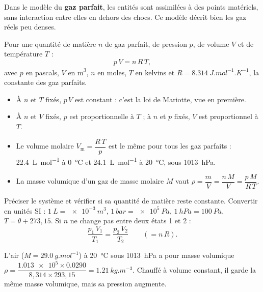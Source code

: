\begin{definition}
Dans le modèle du \textbf{gaz parfait}, les entités sont assimilées à des points matériels, sans interaction entre
elles en dehors des chocs. Ce modèle décrit bien les gaz réels peu denses.
\end{definition}
\begin{loi}
Pour une quantité de matière $n$ de gaz parfait, de pression $p$, de volume $V$ et de température $T$ :
\[p\,V=n\,R\,T,\]
avec $p$ en pascals, $V$ en \unit{m^3}, $n$ en moles, $T$ en kelvins et $R=\qty{8,314}{J.mol^{-1}.K^{-1}}$, la constante des gaz
parfaits.
\end{loi}
\begin{propriete}[Conséquences]
\begin{itemize}
\item À $n$ et $T$ fixés, $p\,V$ est constant : c'est la loi de Mariotte, vue en première.
\item À $n$ et $V$ fixés, $p$ est proportionnelle à $T$ ; à $n$ et $p$ fixés, $V$ est proportionnel à $T$.
\item Le volume molaire $V_\mathrm{m}=\dfrac{R\,T}{p}$ est le même pour tous les gaz parfaits : \qty{22,4}{L.mol^{-1}} à
\qty{0}{\degreeCelsius} et \qty{24,1}{L.mol^{-1}} à \qty{20}{\degreeCelsius}, sous \qty{1013}{hPa}.
\item La masse volumique d'un gaz de masse molaire $M$ vaut $\rho=\dfrac{m}{V}=\dfrac{n\,M}{V}=\dfrac{p\,M}{R\,T}$.
\end{itemize}
\end{propriete}
\begin{savoirfaire}
Préciser le système et vérifier si sa quantité de matière reste constante. Convertir en unités SI :
$\qty{1}{L}=\qty{e-3}{m^3}$, $\qty{1}{bar}=\qty{e5}{Pa}$, $\qty{1}{hPa}=\qty{100}{Pa}$, $T=\theta+273{,}15$. Si $n$ ne change pas
entre deux états 1 et 2 :
\[\frac{p_1\,V_1}{T_1}=\frac{p_2\,V_2}{T_2}\qquad(=n\,R).\]
\end{savoirfaire}
\begin{exemple}
L'air ($M=\qty{29,0}{g.mol^{-1}}$) à \qty{20}{\degreeCelsius} sous \qty{1013}{hPa} a pour masse volumique
$\rho=\dfrac{\num{1.013e5}\times\num{0.0290}}{8{,}314\times293{,}15}=\qty{1,21}{kg.m^{-3}}$. Chauffé à volume constant, il
garde la même masse volumique, mais sa pression augmente.
\end{exemple}
